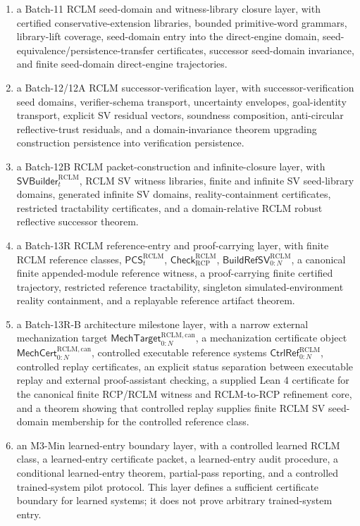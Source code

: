 \documentclass[11pt,a4paper]{article}
\newcommand{\RCP}{\mathrm{RCP}}
\newcommand{\RCLM}{\mathrm{RCLM}}
\begin{document}
\begin{enumerate}[label=(\arabic*),leftmargin=1.5em]
    \item a Batch-11 RCLM seed-domain and witness-library closure layer, with certified conservative-extension libraries, bounded primitive-word grammars, library-lift coverage, seed-domain entry into the direct-engine domain, seed-equivalence/persistence-transfer certificates, successor seed-domain invariance, and finite seed-domain direct-engine trajectories.
    \item a Batch-12/12A RCLM successor-verification layer, with successor-verification seed domains, verifier-schema transport, uncertainty envelopes, goal-identity transport, explicit SV residual vectors, soundness composition, anti-circular reflective-trust residuals, and a domain-invariance theorem upgrading construction persistence into verification persistence.
    \item a Batch-12B RCLM packet-construction and infinite-closure layer, with \(\mathsf{SVBuilder}_t^{\RCLM}\), RCLM SV witness libraries, finite and infinite SV seed-library domains, generated infinite SV domains, reality-containment certificates, restricted tractability certificates, and a domain-relative RCLM robust reflective successor theorem.
    \item a Batch-13R RCLM reference-entry and proof-carrying layer, with finite RCLM reference classes, \(\mathsf{PCS}_t^{\RCLM}\), \(\mathsf{Check}_{\RCP}^{\RCLM}\), \(\mathsf{BuildRefSV}_{0:N}^{\RCLM}\), a canonical finite appended-module reference witness, a proof-carrying finite certified trajectory, restricted reference tractability, singleton simulated-environment reality containment, and a replayable reference artifact theorem.
    \item a Batch-13R-B architecture milestone layer, with a narrow external mechanization target \(\mathsf{MechTarget}_{0:N}^{\RCLM,\mathrm{can}}\), a mechanization certificate object \(\mathsf{MechCert}_{0:N}^{\RCLM,\mathrm{can}}\), controlled executable reference systems \(\mathsf{CtrlRef}_{0:N}^{\RCLM}\), controlled replay certificates, an explicit status separation between executable replay and external proof-assistant checking, a supplied Lean 4 certificate for the canonical finite RCP/RCLM witness and RCLM-to-RCP refinement core, and a theorem showing that controlled replay supplies finite RCLM SV seed-domain membership for the controlled reference class.
    \item an M3-Min learned-entry boundary layer, with a controlled learned RCLM class, a learned-entry certificate packet, a learned-entry audit procedure, a conditional learned-entry theorem, partial-pass reporting, and a controlled trained-system pilot protocol.  This layer defines a sufficient certificate boundary for learned systems; it does not prove arbitrary trained-system entry.

\end{enumerate}
\end{document}
